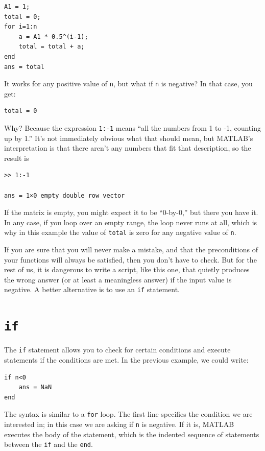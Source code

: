\documentclass{book}
\begin{document}
\begin{verbatim}
A1 = 1;
total = 0;
for i=1:n
    a = A1 * 0.5^(i-1);
    total = total + a;
end
ans = total
\end{verbatim}

It works for any positive value of {\tt n}, but what if {\tt n}
is negative?  In that case, you get:

\begin{verbatim}
total = 0
\end{verbatim}

Why?  Because the expression {\tt 1:-1} means ``all the numbers
from 1 to -1, counting up by 1.''  It's not immediately obvious
what that should mean, but MATLAB's interpretation is that there
aren't any numbers that fit that description, so the result is

\begin{verbatim}
>> 1:-1

ans = 1×0 empty double row vector
\end{verbatim}

If the matrix is empty, you might expect it to be ``0-by-0,'' but
there you have it.  In any case, if you loop over an empty range,
the loop never runs at all, which is why in this example the
value of {\tt total} is zero for any negative value of {\tt n}.

If you are sure that you will never make a mistake, and that the
preconditions of your functions will always be satisfied, then you
don't have to check.  But for the rest of us, it is dangerous to write
a script, like this one, that quietly produces the wrong answer (or
at least a meaningless answer) if the input value is negative.
A better alternative is to use an {\tt if} statement.


\section{{\tt if}}

The {\tt if} statement allows you to check for certain conditions
and execute statements if the conditions are met.  In the previous
example, we could write:

\begin{verbatim}
if n<0
    ans = NaN
end
\end{verbatim}

The syntax is similar to a {\tt for} loop.  The first line
specifies the condition we are interested in; in this case we
are asking if {\tt n} is negative.  If it is, MATLAB executes
the body of the statement, which is the indented sequence of
statements between the {\tt if} and the {\tt end}.
\end{document}
